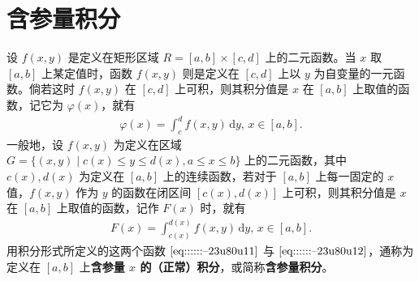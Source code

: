 \documentclass[../../main.tex]{subfiles}
\begin{document}
\section{含参量积分}

\begin{definition}[含参量积分]
设 \( f(x,y) \) 是定义在矩形区域 \( R = [a,b] \times [c,d] \) 上的二元函数。当 \( x \) 取 \( [a,b] \) 上某定值时，函数 \( f(x,y) \) 则是定义在 \( [c,d] \) 上以 \( y \) 为自变量的一元函数。倘若这时 \( f(x,y) \) 在 \( [c,d] \) 上可积，则其积分值是 \( x \) 在 \( [a,b] \) 上取值的函数，记它为 \( \varphi(x) \)，就有
\begin{align}
\varphi(x) = \int_{c}^{d} f(x,y) \, \mathrm{d}y, \, x \in [a,b]. \label{eq::::::--23u80u11}
\end{align}
一般地，设 \( f(x,y) \) 为定义在区域 \( G = \{ (x,y) \mid c(x) \leqslant y \leqslant d(x), a \leqslant x \leqslant b \} \) 上的二元函数，其中 \( c(x), d(x) \) 为定义在 \( [a,b] \) 上的连续函数，若对于 \( [a,b] \) 上每一固定的 \( x \) 值，\( f(x,y) \) 作为 \( y \) 的函数在闭区间 \( [c(x),d(x)] \) 上可积，则其积分值是 \( x \) 在 \( [a,b] \) 上取值的函数，记作 \( F(x) \) 时，就有
\begin{align}
F(x) = \int_{c(x)}^{d(x)} f(x,y) \, \mathrm{d}y, \, x \in [a,b]. \label{eq::::::--23u80u12}
\end{align}
用积分形式所定义的这两个函数 \(\eqref{eq::::::--23u80u11}\) 与 \(\eqref{eq::::::--23u80u12}\)，通称为定义在 \( [a,b] \) 上\textbf{含参量 \( x \) 的（正常）积分}，或简称\textbf{含参量积分}。
\end{definition}
\end{document}
